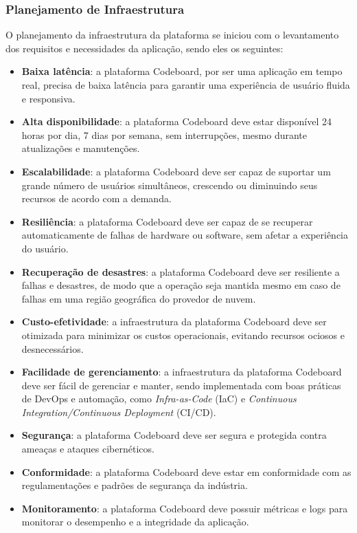 \subsubsection{Planejamento de Infraestrutura}

O planejamento da infraestrutura da plataforma se iniciou com o levantamento dos requisitos e necessidades da aplicação, sendo eles os seguintes:

\begin{itemize}
    \item \textbf{Baixa latência}: a plataforma Codeboard, por ser uma aplicação em tempo real, precisa de baixa latência para garantir uma experiência de usuário fluida e responsiva.
    \item \textbf{Alta disponibilidade}: a plataforma Codeboard deve estar disponível 24 horas por dia, 7 dias por semana, sem interrupções, mesmo durante atualizações e manutenções.
    \item \textbf{Escalabilidade}: a plataforma Codeboard deve ser capaz de suportar um grande número de usuários simultâneos, crescendo ou diminuindo seus recursos de acordo com a demanda.
    \item \textbf{Resiliência}: a plataforma Codeboard deve ser capaz de se recuperar automaticamente de falhas de hardware ou software, sem afetar a experiência do usuário.
    \item \textbf{Recuperação de desastres}: a plataforma Codeboard deve ser resiliente a falhas e desastres, de modo que a operação seja mantida mesmo em caso de falhas em uma região geográfica do provedor de nuvem.
    \item \textbf{Custo-efetividade}: a infraestrutura da plataforma Codeboard deve ser otimizada para minimizar os custos operacionais, evitando recursos ociosos e desnecessários.
    \item \textbf{Facilidade de gerenciamento}: a infraestrutura da plataforma Codeboard deve ser fácil de gerenciar e manter, sendo implementada com boas práticas de DevOps e automação, como \emph{Infra-as-Code} (IaC) e \emph{Continuous Integration/Continuous Deployment} (CI/CD).
    \item \textbf{Segurança}: a plataforma Codeboard deve ser segura e protegida contra ameaças e ataques cibernéticos.
    \item \textbf{Conformidade}: a plataforma Codeboard deve estar em conformidade com as regulamentações e padrões de segurança da indústria.
    \item \textbf{Monitoramento}: a plataforma Codeboard deve possuir métricas e logs para monitorar o desempenho e a integridade da aplicação. 
\end{itemize}


